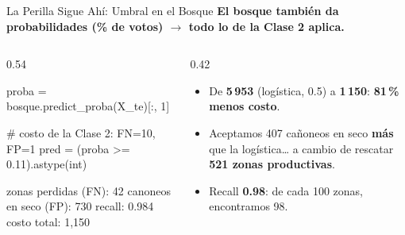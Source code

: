 \documentclass[aspectratio=169, 11pt]{beamer}
\begin{document}
\begin{frame}[fragile,shrink=20]{La Perilla Sigue Ahí: Umbral en el Bosque}
  \vspace{-4pt}
  {\small\color{arcaDark}\bfseries
    El bosque también da probabilidades (\% de votos) \(\to\) todo lo de la Clase 2 aplica.}

  \vspace{4pt}
  \begin{columns}[T]
    \begin{column}{0.54\textwidth}
      \begin{pyblock}
proba = bosque.predict_proba(X_te)[:, 1]

# costo de la Clase 2: FN=10, FP=1
pred = (proba >= 0.11).astype(int)
      \end{pyblock}
      \vspace{2pt}
      \begin{outputblock}[title={\small\faTerminal\hspace{6pt}con umbral 0.11}]
zonas perdidas (FN):    42
canoneos en seco (FP): 730
recall:              0.984
costo total:         1,150
      \end{outputblock}
    \end{column}
    \begin{column}{0.42\textwidth}
      {\scriptsize\color{textMuted}
      \begin{itemize}\setlength{\itemsep}{5pt}
        \item[{\color{codeGreen}\scriptsize\faTrophy}]
          De \textbf{5\,953} (logística, 0.5) a \textbf{1\,150}:
          \textbf{81\,\% menos costo}.
        \item[{\color{arcaRed}\scriptsize\faArrowRight}]
          Aceptamos 407 cañoneos en seco \textbf{más} que
          la logística\ldots{} a cambio de rescatar
          \textbf{521 zonas productivas}.
        \item[{\color{codeGreen}\scriptsize\faCheck}]
          Recall \textbf{0.98}: de cada 100 zonas,
          encontramos 98.
      \end{itemize}
      }
    \end{column}
  \end{columns}
\end{frame}
\end{document}
